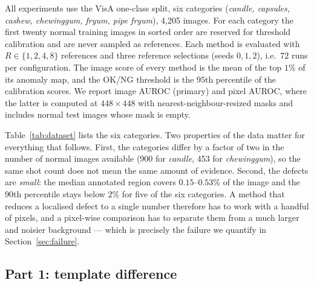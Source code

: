 \documentclass[10pt,twocolumn,letterpaper]{article}
\begin{document}
All experiments use the VisA one-class split, six categories (\emph{candle,
capsules, cashew, chewinggum, fryum, pipe fryum}), 4{,}205 images. For each
category the first twenty normal training images in sorted order are reserved
for threshold calibration and are never sampled as references. Each method is
evaluated with $R\in\{1,2,4,8\}$ references and three reference selections
(seeds $0,1,2$), i.e.\ $72$ runs per configuration. The image score of every
method is the mean of the top $1\%$ of its anomaly map, and the OK/NG threshold
is the $95$th percentile of the calibration scores. We report image AUROC
(primary) and pixel AUROC, where the latter is computed at $448\times448$ with
nearest-neighbour-resized masks and includes normal test images whose mask is
empty.

Table~\ref{tab:dataset} lists the six categories. Two properties of the data
matter for everything that follows. First, the categories differ by a factor of
two in the number of normal images available (900 for \emph{candle}, 453 for
\emph{chewinggum}), so the same shot count does not mean the same amount of
evidence. Second, the defects are \emph{small}: the median annotated region
covers $0.15$--$0.53\%$ of the image and the 90th percentile stays below $2\%$
for five of the six categories. A method that reduces a localised defect to a
single number therefore has to work with a handful of pixels, and a pixel-wise
comparison has to separate them from a much larger and noisier background ---
which is precisely the failure we quantify in Section~\ref{sec:failure}.



\subsection{Part 1: template difference}
\end{document}
